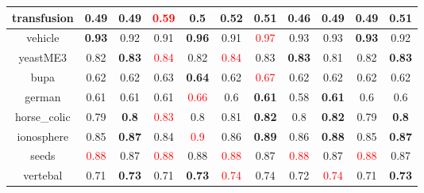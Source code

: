 \documentclass{article}%
\begin{document}
\begin{tabular}{c|cccccccccc}
\hline%
transfusion&0.49&0.49&\textcolor{red}{ 
0.59
}&0.5&\textbf{0.52}&0.51&0.46&\textbf{0.49}&0.49&\textbf{0.51}\\%
\hline%
vehicle&\textbf{0.93}&0.92&0.91&\textbf{0.96}&0.91&\textcolor{red}{ 
0.97
}&0.93&0.93&\textbf{0.93}&0.92\\%
\hline%
yeastME3&0.82&\textbf{0.83}&\textcolor{red}{ 
0.84
}&0.82&\textcolor{red}{ 
0.84
}&0.83&\textbf{0.83}&0.81&0.82&\textbf{0.83}\\%
\hline%
bupa&0.62&0.62&0.63&\textbf{0.64}&0.62&\textcolor{red}{ 
0.67
}&0.62&0.62&0.62&0.62\\%
\hline%
german&0.61&0.61&0.61&\textcolor{red}{ 
0.66
}&0.6&\textbf{0.61}&0.58&\textbf{0.61}&0.6&0.6\\%
\hline%
horse\_colic&0.79&\textbf{0.8}&\textcolor{red}{ 
0.83
}&0.8&0.81&\textbf{0.82}&0.8&\textbf{0.82}&0.79&\textbf{0.8}\\%
\hline%
ionosphere&0.85&\textbf{0.87}&0.84&\textcolor{red}{ 
0.9
}&0.86&\textbf{0.89}&0.86&\textbf{0.88}&0.85&\textbf{0.87}\\%
\hline%
seeds&\textcolor{red}{ 
0.88
}&0.87&\textcolor{red}{ 
0.88
}&0.88&\textcolor{red}{ 
0.88
}&0.87&\textcolor{red}{ 
0.88
}&0.87&\textcolor{red}{ 
0.88
}&0.87\\%
\hline%
vertebal&0.71&\textbf{0.73}&0.71&\textbf{0.73}&\textcolor{red}{ 
0.74
}&0.74&0.72&\textcolor{red}{ 
0.74
}&0.71&\textbf{0.73}\\%
\hline%
\end{tabular}

%
\end{document}
